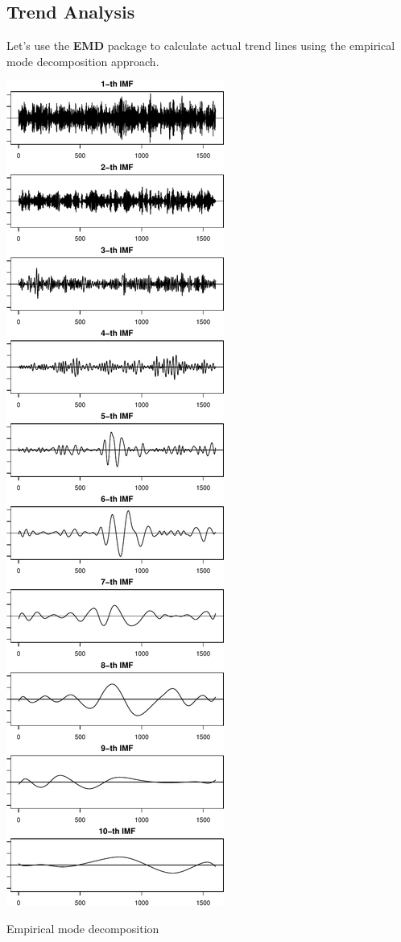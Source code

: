 \documentclass[11pt,]{tufte-handout}
\begin{document}
\subsection{Trend Analysis}\label{trend-analysis}

Let's use the \textbf{EMD} package to calculate actual trend lines using
the empirical mode decomposition approach.

\begin{marginfigure}
\includegraphics{proxymodelcomparison_files/figure-latex/unnamed-chunk-2-1} \caption[Empirical mode decomposition]{Empirical mode decomposition}\label{fig:unnamed-chunk-2}
\end{marginfigure}
\end{document}
